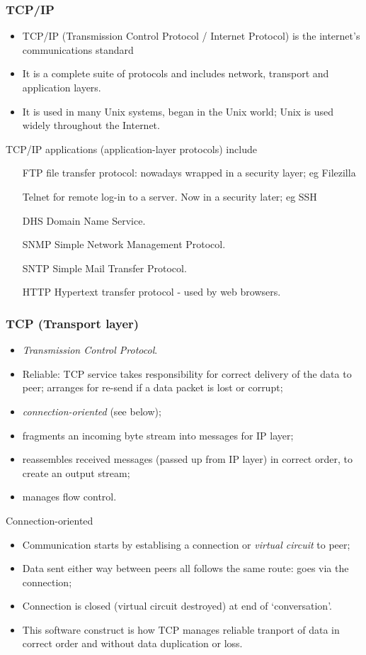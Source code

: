 \documentclass[10pt, hyperref={pdfpagelabels=false}]{beamer}
\begin{document}
\begin{frame}
\frametitle{TCP/IP}
\begin{itemize}
\item TCP/IP (Transmission Control Protocol / Internet Protocol) is the internet’s communications standard
\item It is a complete suite of protocols and includes network, transport and application layers.
\item It is used in many Unix systems, began in the Unix world; Unix is used widely throughout the Internet.
\end{itemize}

TCP/IP applications (application-layer protocols) include
\begin{itemize}
\item[FTP] file transfer protocol: nowadays wrapped in a security layer; eg Filezilla
\item[Telnet] for remote log-in to a server. Now in a security later; eg SSH
\item[DHS] Domain Name Service.
\item[SNMP] Simple Network Management Protocol.
\item[SNTP] Simple Mail Transfer Protocol.
\item[HTTP] Hypertext transfer protocol - used by web browsers.
\end{itemize}
\end{frame}

\begin{frame}
\frametitle{TCP (Transport layer)}
\begin{itemize}
\item \emph{\color{blue}Transmission Control Protocol}.
\item Reliable: TCP service takes responsibility for correct delivery of the data to peer; arranges for re-send if a data packet is lost or corrupt;
\item \emph{\color{blue}connection-oriented} (see below);
\item fragments an incoming byte stream into messages for IP layer;
\item reassembles received messages (passed up from IP layer) in correct order, to create an output stream;
\item manages flow control.
\end{itemize}

Connection-oriented
\begin{itemize}
\item Communication starts by establising a connection or \emph{\color{blue}virtual circuit} to peer;
\item Data sent either way between peers all follows the same route: goes via the connection;
\item Connection is closed (virtual circuit destroyed) at end of `conversation'.
\item This software construct is how TCP manages reliable tranport of data in correct order and without data duplication or loss.
\end{itemize}
\end{frame}
\end{document}
